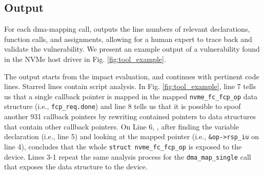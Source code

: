 \begin{table}[]
\centering
{}
\vspace{1mm}
\caption{\tool result summary.}
\label{tab:static_analysis}
\end{table}

\subsection{Output}
For each dma-mapping call, \tool outputs the line numbers of relevant declarations, function calls, and assignments, allowing for a human expert to trace back and validate the vulnerability. We present an example output of a vulnerability found in the NVMe host driver in Fig. \ref{fig:tool_example}.

The output starts from the impact evaluation, and continues with pertinent code lines. Starred lines contain script analysis. In Fig. \ref{fig:tool_example}, line 7 tells us that a single callback pointer is mapped in the mapped \texttt{nvme\_fc\_fcp\_op} data structure (i.e., \texttt{fcp\_req.done}) and line 8 tells us that it is possible to spoof another 931 callback pointers by rewriting contained pointers to data structures that contain other callback pointers. On Line 6, \tool, after finding the variable declaration (i.e., line 5) and looking at the mapped pointer (i.e., \texttt{\&op->rsp\_iu} on line 4), concludes that the whole \texttt{struct nvme\_fc\_fcp\_op} is exposed to the device. Lines 3-1 repeat the same analysis process for the \texttt{dma\_map\_single} call that exposes the data structure to the device. 

